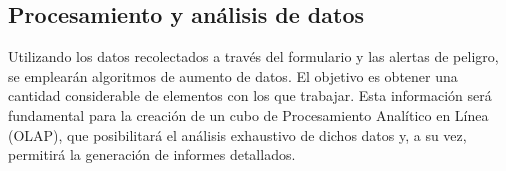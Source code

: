 \subsection{Procesamiento y análisis de datos}
Utilizando los datos recolectados a través del formulario y las alertas de peligro, se
emplearán algoritmos de aumento de datos. El objetivo es obtener una cantidad considerable
de elementos con los que trabajar. Esta información será fundamental para la creación de un
cubo de Procesamiento Analítico en Línea (OLAP), que posibilitará el análisis exhaustivo de
dichos datos y, a su vez, permitirá la generación de informes detallados.